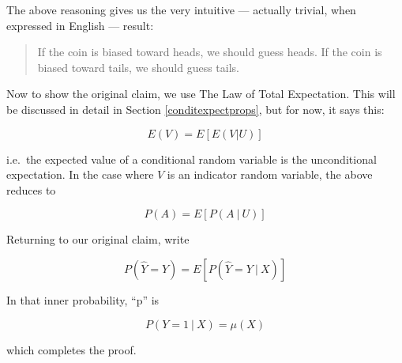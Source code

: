 The above reasoning gives us the very intuitive --- actually trivial,
when expressed in English --- result:

\begin{quote}
If the coin is biased toward heads, we should guess heads.  If the coin
is biased toward tails, we should guess tails.
\end{quote}
 
Now to show the original claim, we use The Law of Total Expectation.
This will be discussed in detail in Section \ref{conditexpectprops},
but for now, it says this:

\begin{equation}
E(V) = E[E(V|U)]
\end{equation}

i.e.\ the expected value of a conditional random variable is the
unconditional expectation.  In the case where $V$ is an indicator random
variable, the above reduces to

\begin{equation}
\label{peqepgivu}
P(A) = E[P(A ~|~ U)] 
\end{equation}

Returning to our original claim, write

\begin{equation}
P(\widehat{Y} = Y) = 
E \left [
P(\widehat{Y} = Y ~|~ X) 
\right ]
\end{equation}

In that inner probability, ``p'' is 

\begin{equation}
P(Y = 1 ~|~ X) = \mu(X)
\end{equation}

which completes the proof.

